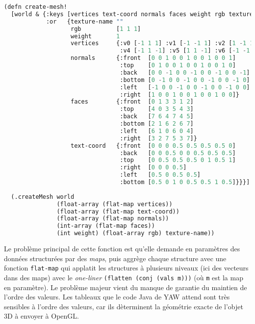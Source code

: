 \documentclass{report}
\begin{document}
\begin{lstlisting}[caption=Code complet de \texttt{create-mesh!},label={lst:oldbox},language=Lisp]
(defn create-mesh!
  [world & {:keys [vertices text-coord normals faces weight rgb texture-name]
            :or   {texture-name ""
                   rgb          [1 1 1]
                   weight       1
                   vertices     {:v0 [-1 1 1] :v1 [-1 -1 1] :v2 [1 -1 1] :v3 [1 1 1]
                                 :v4 [-1 1 -1] :v5 [1 1 -1] :v6 [-1 -1 -1] :v7 [1 -1 -1]}
                   normals      {:front  [0 0 1 0 0 1 0 0 1 0 0 1]
                                 :top    [0 1 0 0 1 0 0 1 0 0 1 0]
                                 :back   [0 0 -1 0 0 -1 0 0 -1 0 0 -1]
                                 :bottom [0 -1 0 0 -1 0 0 -1 0 0 -1 0]
                                 :left   [-1 0 0 -1 0 0 -1 0 0 -1 0 0]
                                 :right  [1 0 0 1 0 0 1 0 0 1 0 0]}
                   faces        {:front  [0 1 3 3 1 2]
                                 :top    [4 0 3 5 4 3]
                                 :back   [7 6 4 7 4 5]
                                 :bottom [2 1 6 2 6 7]
                                 :left   [6 1 0 6 0 4]
                                 :right  [3 2 7 5 3 7]}
                   text-coord   {:front  [0 0 0 0.5 0.5 0.5 0.5 0]
                                 :back   [0 0 0.5 0 0 0.5 0.5 0.5]
                                 :top    [0 0.5 0.5 0.5 0 1 0.5 1]
                                 :right  [0 0 0 0.5]
                                 :left   [0.5 0 0.5 0.5]
                                 :bottom [0.5 0 1 0 0.5 0.5 1 0.5]}}}]
 
  (.createMesh world
               (float-array (flat-map vertices))
               (float-array (flat-map text-coord))
               (float-array (flat-map normals))
               (int-array (flat-map faces))
               (int weight) (float-array rgb) texture-name))

\end{lstlisting}

Le problème principal de cette fonction est qu'elle demande en paramètres des
données structurées par des \emph{maps}, puis aggrège chaque structure avec une
fonction \lstinline|flat-map| qui \og applatit\fg{} les structures à plusieurs
niveaux (ici des vecteurs dans des maps) avec le \emph{one-liner}
\lstinline|(flatten (conj (vals m)))| (où \lstinline|m| est la map en paramètre).
Le problème majeur vient du manque de garantie du maintien de l'ordre des
valeurs. Les tableaux que le code Java de YAW attend sont très sensibles à
l'ordre des valeurs, car ils dèterminent la géométrie exacte de l'objet 3D à
envoyer à OpenGL.
\end{document}

